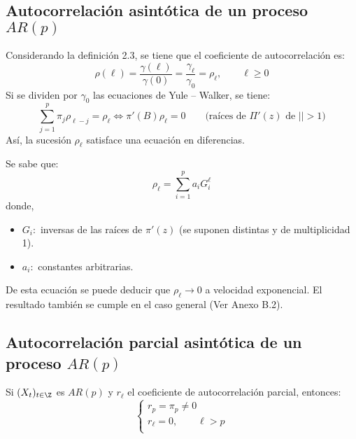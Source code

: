 \subsection{Autocorrelaci\'{o}n asint\'{o}tica de un proceso $AR(p)$}

Considerando la definici\'{o}n 2.3, se tiene que el coeficiente de autocorrelaci\'{o}n es:
\[
\rho \left( \ell \right)=\frac{\gamma (\ell)}{\gamma(0)}=\frac{\gamma_{\ell}}{\gamma_{0}}=\rho_{\ell}, \qquad  \ell\ge 0
\]
Si se dividen por $\gamma_{0} $ las ecuaciones de Yule -- Walker, se tiene:
\[
 \sum_{j=1}^p {\pi_{j} \rho_{\ell -j} =\rho_{\ell } \Leftrightarrow \pi'\left( B \right)\rho_{\ell } =0} \qquad \text{(ra\'{i}ces de $\Pi'(z)$ de $| |>1$)}
\]
As\'{i}, la sucesi\'{o}n $\rho_{\ell } $ satisface una ecuaci\'{o}n en diferencias.\newline

Se sabe que:
\[
\rho_{\ell } =\sum_{i=1}^p {a_{i} G_{i}^{\ell } } 
\]
donde, 
\begin{itemize}
 \item $G_{i}:$ inversas de las ra\'{i}ces de $\pi'\left( z \right)$ (se suponen distintas y de multiplicidad 1).
 \item $a_{i}:$ constantes arbitrarias.
\end{itemize}

De esta ecuaci\'{o}n se puede deducir que $\rho_{\ell } \to 0$ a velocidad exponencial. El resultado tambi\'{e}n se cumple en el caso general (Ver Anexo B.2).

\subsection{Autocorrelaci\'{o}n parcial asint\'{o}tica de un proceso $AR (p)$}

\begin{teorema}
Si $(X_{t} )_{t\in \Z} $ es $AR (p)$ y $r_{\ell }$ el coeficiente de autocorrelaci\'{o}n parcial, entonces:
\[
\left\{ {\begin{array}{l}
 r_{p} =\pi_{p} \ne 0 \\ 
 r_{\ell } =0,\qquad \ell >p \\ 
 \end{array}} \right.
\]
\end{teorema}

